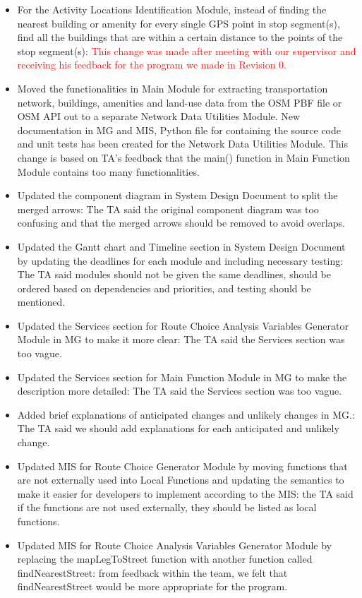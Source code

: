\documentclass{article}
\begin{document}
\begin{itemize}
     \item For the Activity Locations Identification Module, instead of finding the nearest building or amenity for every single GPS point in stop segment(s), find all the buildings that are within a certain distance to the points of the stop segment(s): \textcolor{red}{This change was made after meeting with our supervisor and receiving his feedback for the program we made in Revision 0.}
    \item Moved the functionalities in Main Module for extracting transportation network, buildings, amenities and land-use data from the OSM PBF file or OSM API out to a separate Network Data Utilities Module. New documentation in MG and MIS, Python file for containing the source code and unit tests has been created for the Network Data Utilities Module. This change is based on TA's feedback that the main() function in Main Function Module contains too many functionalities.
    \item Updated the component diagram in System Design Document to split the merged arrows: The TA said the original component diagram was too confusing and that the merged arrows should be removed to avoid overlaps.
    \item Updated the Gantt chart and Timeline section in System Design Document by updating the deadlines for each module and including necessary testing: The TA said modules should not be given the same deadlines, should be ordered based on dependencies and priorities, and testing should be mentioned.
    \item Updated the Services section for Route Choice Analysis Variables Generator Module in MG to make it more clear: The TA said the Services section was too vague.
    \item Updated the Services section for Main Function Module in MG to make the description more detailed: The TA said the Services section was too vague.
    \item Added brief explanations of anticipated changes and unlikely changes in MG.: The TA said we should add explanations for each anticipated and unlikely change.
    \item Updated MIS for Route Choice Generator Module by moving functions that are not externally used into Local Functions and updating the semantics to make it easier for developers to implement according to the MIS: the TA said if the functions are not used externally, they should be listed as local functions.
    \item Updated MIS for Route Choice Analysis Variables Generator Module by replacing the mapLegToStreet function with another function called findNearestStreet: from feedback within the team, we felt that findNearestStreet would be more appropriate for the program.

\end{itemize}
\end{document}
